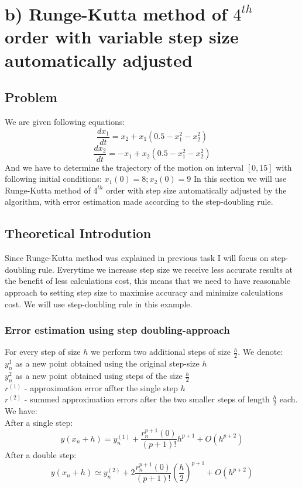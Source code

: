 \section{b) Runge-Kutta method of $4^{th}$ order with variable step size automatically adjusted}
\subsection{Problem}
We are given following equations:
\[ \frac{dx_1}{dt} = x_2 + x_1(0.5 - x_1^2 - x_2^2) \]
\[ \frac{dx_2}{dt} = -x_1 + x_2(0.5 - x_1^2 - x_2^2) \]
And we have to determine the trajectory of the motion on interval $[0, 15]$ with following initial conditions:
$ x_1(0) = 8; x_2(0) = 9 $
In this section we will use Runge-Kutta method of $4^{th}$ order with step size automatically adjusted by the algorithm, with error estimation made according to the step-doubling rule.
\subsection{Theoretical Introdution}
Since Runge-Kutta method was explained in previous task I will focus on step-doubling rule.
Everytime we increase step size we receive less accurate results at the benefit of less calculations cost, this means that we need to have reasonable approach to setting step size to maximise accuracy and minimize calculations cost. We will use step-doubling rule in this example.

\subsubsection{Error estimation using step doubling-approach}
For every step of size $h$ we perform two additional steps of size $\frac{h}{2}$. We denote: \\
$y_n^{1}$ as a new point obtained using the original step-size $h$ \\
$y_n^{2}$ as a new point obtained using steps of the size $\frac{h}{2}$ \\
$r^{(1)}$ - approximation error affter the single step $h$ \\
$r^{(2)}$ - summed approximation errors after the two smaller steps of length $\frac{h}{2}$ each. \\
We have: \\
\newpage
After a single step:
\[ y(x_n + h) = y_n^{(1)} + \frac{r_n^{p+1}(0)}{(p+1)!}h^{p+1} + O(h^{p+2}) \]
After a double step:
\[  y(x_n+h) \simeq y_n^{(2)} + 2\frac{r_n^{p+1}(0)}{(p+1)!}(\frac{h}{2})^{p+1} + O(h^{p+2}) \]

